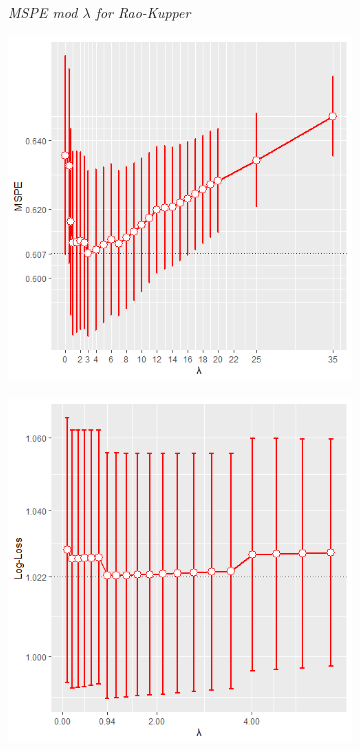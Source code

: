 \documentclass[11pt,a4paper]{article}
\begin{document}
\begin{figure}[h!]
\begin{subfigure}[b]{0.45\textwidth}
    \caption{\textit{MSPE mod $\lambda$ for Rao-Kupper}}
    \label{fig:MSPEBarStat}
  \end{subfigure}
  \hspace{0.2cm}
    \begin{subfigure}[b]{0.45\textwidth}
    \includegraphics[width=\textwidth]{BARMSPENYALPHA.png}
    \label{fig:MSPEBarDyn}  
    \end{subfigure}
    \hspace{0.2cm}
  \begin{subfigure}[b]{0.45\linewidth}
    \includegraphics[width=\textwidth]{STATLOGLOSSBARNY1.png}

\end{subfigure}
\end{figure}
\end{document}
